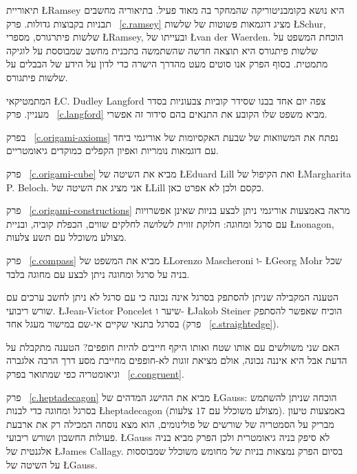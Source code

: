 
תיאוריית 
\L{Ramsey}
היא נושא בקומבניטוריקה שהמחקר בה מאוד פעיל. בתיאוריה מחשבים תבניות בקבוצות גדולות. פרק~%
\ref{c.ramsey}
מציג דוגמאות פשוטות של שלשות
\L{Schur},
שלשות פיתרגורס,
מספרי 
\L{Ramsey},
ובעייתו של
\L{van der Waerden}.
הוכחת המשפט על שלשות פיתגורס היא תוצאה חדשה שהשתמשה בתכנית מחשב שמבוססת על לוגיקה מתמטית. בסוף הפרק אנו סוטים מעט מהדרך הישרה כדי לדון על הידע של הבבלים על שלשות פיתגורס.

המתמטיקאי
\L{C. Dudley Langford}
צפה יום אחד בבנו שסידר קוביות צבעוניות בסדר מעניין. 
פרק~%
\ref{c.langford}
מביא משפט שלו הקובע את התנאים בהם סידור זה אפשרי.



בפרק%
~\ref{c.origami-axioms}
נפתח את המשוואות של שבעת האקסיומות של אוריגמי ביחד עם דוגמאות נומריות ואפיון הקפלים כמוקדים גיאומטריים.

פרק~%
\ref{c.origami-cube}
מביא את השיטה של
\L{Eduard Lill}
ואת הקיפול של
\L{Margharita P. Beloch}.
אני מציג את השיטה של
\L{Lill}
כקסם ולכן לא אפרט כאן.

פרק~%
\ref{c.origami-constructions}
מראה באמצעות אוריגמי ניתן לבצע בניות שאינן אפשרויות עם סרגל ומחוגה: חלוקת זווית לשלושה לחלקים שווים, הכפלת קוביה, ובניית 
\L{nonagon},
מצולע משוכלל עם תשע צלעות.


פרק~%
\ref{c.compass}
מביא את המשפט של 
\L{Lorenzo Mascheroni}
ו-%
\L{Georg Mohr} 
שכל בניה על סרגל ומחוגה ניתן לבצע עם מחוגה בלבד.

הטענה המקבילה שניתן להסתפק בסרגל אינה נכונה כי עם סרגל לא ניתן לחשב ערכים עם שורש ריבועי.
\L{Jean-Victor Poncelet}
שיער ו-%
\L{Jakob Steiner}
הוכיח שאפשר להסתפק בסרגל בתנאי שקיים אי-שם במישור מעגל אחד (פרק~%
\ref{c.straightedge}).


האם שני משולשים עם אותו שטח ואותו היקף חייבים להיות חופפים? הטענה מתקבלת על הדעת אבל היא איננה נכונה, אולם מציאת זוגות לא-חופפים מחייבת מסע דרך הרבה אלגברה וגיאומטריה כפי שמתואר בפרק~%
\ref{c.congruent}.


פרק~%
\ref{c.heptadecagon}
מביא את ההישג המדהים של 
\L{Gauss}:
הוכחה שניתן להשתמש בסרגל ומחוגה כדי לבנות 
\L{heptadecagon}
(מצולע משוכלל עם $17$ צלעות). באמצעות טיעון מבריק על הסמטריה של שורשים של פולינומים, הוא מצא נוסחה המכילה רק את ארבעת פעולות החשבון ושורש ריבועי. 
\L{Gauss}
לא סיפק בניה גיאומטרית ולכן הפרק מביא בניה אלגנטית של 
\L{James Callagy}.
בסיום הפרק נמצאות בניות של מחומש משוכלל שמבוססות על השיטה של
\L{Gauss}.


